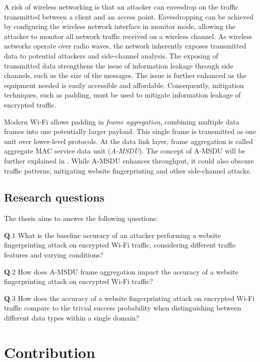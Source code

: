 A risk of wireless networking is that an attacker can eavesdrop on the traffic transmitted between a client and an access point. Eavesdropping can be achieved by configuring the wireless network interface in monitor mode, allowing the attacker to monitor all network traffic received on a wireless channel. As wireless networks operate over radio waves, the network inherently exposes transmitted data to potential attackers and side-channel analysis. The exposing of transmitted data strengthens the issue of information leakage through side channels, such as the size of the messages. The issue is further enhanced as the equipment needed is easily accessible and affordable. Consequently, mitigation techniques, such as padding, must be used to mitigate information leakage of encrypted traffic.

Modern Wi-Fi allows padding in \textit{frame aggregation}, combining multiple data frames into one potentially larger payload. This single frame is transmitted as one unit over lower-level protocols. At the data link layer, frame aggregation is called aggregate MAC service data unit (\textit{A-MSDU}). The concept of A-MSDU will be further explained in . While A-MSDU enhances throughput, it could also obscure traffic patterns, mitigating website fingerprinting and other side-channel attacks.

\subsection{Research questions\label{sec:questions-intro}}
The thesis aims to answer the following questions:

\begin{noitemize}
  \item $\mathbf{Q.1}$ What is the baseline accuracy of an attacker performing a website fingerprinting attack on encrypted Wi-Fi traffic, considering different traffic features and varying conditions?
  \item $\mathbf{Q.2}$ How does A-MSDU frame aggregation impact the accuracy of a website fingerprinting attack on encrypted Wi-Fi traffic?
  \item $\mathbf{Q.3}$ How does the accuracy of a website fingerprinting attack on encrypted Wi-Fi traffic compare to the trivial success probability when distinguishing between different data types within a single domain?
\end{noitemize}

\section{Contribution\label{sec:contribution-intro}}

